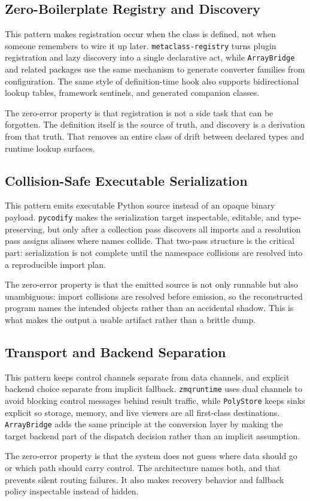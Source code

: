 \subsection{Zero-Boilerplate Registry and Discovery}
This pattern makes registration occur when the class is defined, not when someone remembers to wire it up later. \texttt{metaclass-registry} turns plugin registration and lazy discovery into a single declarative act, while \texttt{ArrayBridge} and related packages use the same mechanism to generate converter families from configuration. The same style of definition-time hook also supports bidirectional lookup tables, framework sentinels, and generated companion classes.

The zero-error property is that registration is not a side task that can be forgotten. The definition itself is the source of truth, and discovery is a derivation from that truth. That removes an entire class of drift between declared types and runtime lookup surfaces.

\subsection{Collision-Safe Executable Serialization}
This pattern emits executable Python source instead of an opaque binary payload. \texttt{pycodify} makes the serialization target inspectable, editable, and type-preserving, but only after a collection pass discovers all imports and a resolution pass assigns aliases where names collide. That two-pass structure is the critical part: serialization is not complete until the namespace collisions are resolved into a reproducible import plan.

The zero-error property is that the emitted source is not only runnable but also unambiguous: import collisions are resolved before emission, so the reconstructed program names the intended objects rather than an accidental shadow. This is what makes the output a usable artifact rather than a brittle dump.

\subsection{Transport and Backend Separation}
This pattern keeps control channels separate from data channels, and explicit backend choice separate from implicit fallback. \texttt{zmqruntime} uses dual channels to avoid blocking control messages behind result traffic, while \texttt{PolyStore} keeps sinks explicit so storage, memory, and live viewers are all first-class destinations. \texttt{ArrayBridge} adds the same principle at the conversion layer by making the target backend part of the dispatch decision rather than an implicit assumption.

The zero-error property is that the system does not guess where data should go or which path should carry control. The architecture names both, and that prevents silent routing failures. It also makes recovery behavior and fallback policy inspectable instead of hidden.
